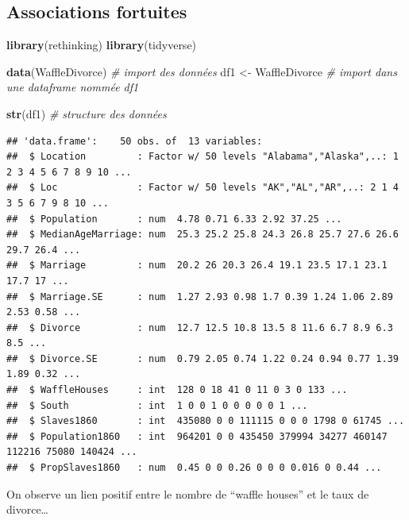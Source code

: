 \documentclass[
  a4paper,11pt,twoside,onecolumn,openright,final,oldfontcommands]{memoir}
\newenvironment{Shaded}{\begin{snugshade}}{\end{snugshade}}
\newcommand{\CommentTok}[1]{\textcolor[rgb]{0.56,0.35,0.01}{\textit{#1}}}
\newcommand{\KeywordTok}[1]{\textcolor[rgb]{0.13,0.29,0.53}{\textbf{#1}}}
\newcommand{\NormalTok}[1]{#1}
\newcommand{\StringTok}[1]{\textcolor[rgb]{0.31,0.60,0.02}{#1}}
\theoremstyle{definition}
\theoremstyle{definition}
\theoremstyle{definition}
\theoremstyle{remark}
\begin{document}
\hypertarget{associations-fortuites}{%
\subsection{Associations fortuites}\label{associations-fortuites}}

\begin{Shaded}
\begin{Highlighting}[]
\KeywordTok{library}\NormalTok{(rethinking)}
\KeywordTok{library}\NormalTok{(tidyverse)}

\KeywordTok{data}\NormalTok{(WaffleDivorce) }\CommentTok{\# import des données}
\NormalTok{df1 \textless{}{-}}\StringTok{ }\NormalTok{WaffleDivorce }\CommentTok{\# import dans une dataframe nommée df1}

\KeywordTok{str}\NormalTok{(df1) }\CommentTok{\# structure des données}
\end{Highlighting}
\end{Shaded}

\begin{verbatim}
## 'data.frame':    50 obs. of  13 variables:
##  $ Location         : Factor w/ 50 levels "Alabama","Alaska",..: 1 2 3 4 5 6 7 8 9 10 ...
##  $ Loc              : Factor w/ 50 levels "AK","AL","AR",..: 2 1 4 3 5 6 7 9 8 10 ...
##  $ Population       : num  4.78 0.71 6.33 2.92 37.25 ...
##  $ MedianAgeMarriage: num  25.3 25.2 25.8 24.3 26.8 25.7 27.6 26.6 29.7 26.4 ...
##  $ Marriage         : num  20.2 26 20.3 26.4 19.1 23.5 17.1 23.1 17.7 17 ...
##  $ Marriage.SE      : num  1.27 2.93 0.98 1.7 0.39 1.24 1.06 2.89 2.53 0.58 ...
##  $ Divorce          : num  12.7 12.5 10.8 13.5 8 11.6 6.7 8.9 6.3 8.5 ...
##  $ Divorce.SE       : num  0.79 2.05 0.74 1.22 0.24 0.94 0.77 1.39 1.89 0.32 ...
##  $ WaffleHouses     : int  128 0 18 41 0 11 0 3 0 133 ...
##  $ South            : int  1 0 0 1 0 0 0 0 0 1 ...
##  $ Slaves1860       : int  435080 0 0 111115 0 0 0 1798 0 61745 ...
##  $ Population1860   : int  964201 0 0 435450 379994 34277 460147 112216 75080 140424 ...
##  $ PropSlaves1860   : num  0.45 0 0 0.26 0 0 0 0.016 0 0.44 ...
\end{verbatim}

On observe un lien positif entre le nombre de ``waffle houses'' et le taux de divorce\ldots{}
\end{document}
